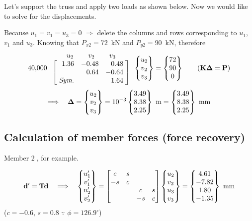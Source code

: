 Let's support the truss and apply two loads as shown below. Now we would like to solve for the displacements.
\begin{fig}
  
\end{fig}
Because $u_1 = v_1 = u_3 = 0$ $\Rightarrow$ delete the columns and rows corresponding to $u_1$, $v_1$ and $u_3$. Knowing that $P_{x2} = 72$~kN and $P_{y2} = 90$~kN, therefore
\begin{equation}
  40{,}000\;
  \begin{array}{c}
    \begin{array}{ccc} \;\;u_2\;\; & \;\;v_2\;\; & \;\;v_3\;\; \end{array}\\
    \left[\begin{array}{@{\;}r@{\quad}r@{\quad}r@{\;}}
      1.36 & -0.48 & 0.48\\ & 0.64 & -0.64\\ \textit{Sym.} & & 1.64
    \end{array}\right]
  \end{array}
  \Bmat{u_2\\ v_2\\ v_3} = \Bmat{72\\ 90\\ 0}
  \qquad (\Kmat\bs{\Delta} = \Pvec)
\end{equation}
\begin{equation}
  \Longrightarrow\quad \bm{\Delta} = \begin{Bmatrix}u_2\\ v_2\\ v_3\end{Bmatrix} = 10^{-3}\begin{Bmatrix}3.49\\ 8.38\\ 2.25\end{Bmatrix}\text{ m} = \begin{Bmatrix}3.49\\ 8.38\\ 2.25\end{Bmatrix}\text{ mm}
\end{equation}

\subsection*{Calculation of member forces (force recovery)}
Member \textcircled{\scriptsize 2}, for example.

\begin{fig}
  
\end{fig}
\begin{equation}
  \mathbf{d}' = \mathbf{T}\mathbf{d} \quad\Longrightarrow\quad
  \begin{Bmatrix}u_1'\\ v_1'\\ u_2'\\ v_2'\end{Bmatrix} =
  \begin{bmatrix}c & s & & \\ -s & c & & \\ & & c & s\\ & & -s & c\end{bmatrix}
  \begin{Bmatrix}u_2\\ v_2\\ u_3\\ v_3\end{Bmatrix} = \begin{Bmatrix}4.61\\ -7.82\\ 1.80\\ -1.35\end{Bmatrix}\text{ mm}
\end{equation}
($c = -0.6$, $s = 0.8$ $\because$ $\phi = 126.9^\circ$)

